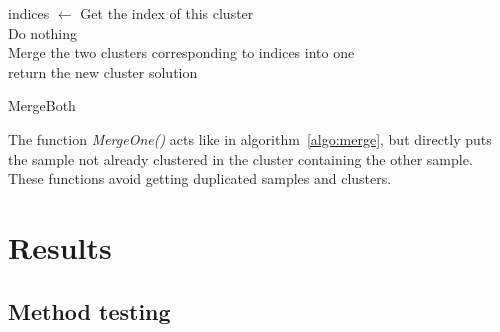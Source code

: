 \documentclass[twocolumn]{article}
\begin{document}
\begin{algorithm}[!]
 \BlankLine
 {
  {
   indices $\leftarrow$ Get the index of this cluster\\
  }
  \Else
  {
   Do nothing\\
  }
 }
 Merge the two clusters corresponding to indices into one\\
 return the new cluster solution
 \caption{MergeBoth}
 \label{algo:merge}
\end{algorithm}
The function \emph{MergeOne()} acts like in algorithm~\ref{algo:merge}, but directly puts the sample not already clustered in the cluster containing the other sample.
These functions avoid getting duplicated samples and clusters.

\section{Results}

\subsection{Method testing}
\end{document}
